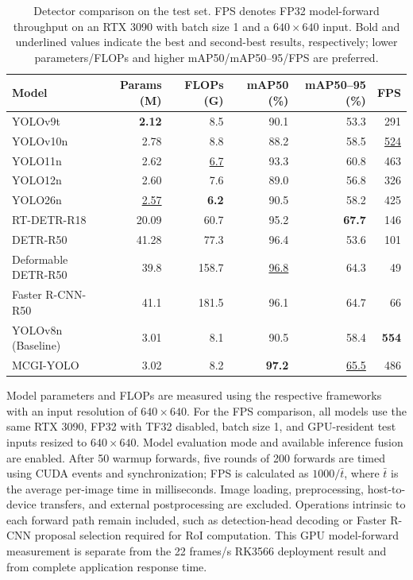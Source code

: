 \documentclass[journal]{IEEEtran}
\newcommand{\model}{MCGI-YOLO\xspace}
\begin{document}
\begin{table}[!t]
\caption{Detector comparison on the test set. FPS denotes FP32 model-forward throughput on an RTX 3090 with batch size 1 and a $640\times640$ input. Bold and underlined values indicate the best and second-best results, respectively; lower parameters/FLOPs and higher mAP50/mAP50--95/FPS are preferred.}
\label{tab:comparison}
\centering
\small
\setlength{\tabcolsep}{6pt}
\renewcommand{\arraystretch}{1.06}
\begin{tabular*}{\textwidth}{@{\extracolsep{\fill}}lrrrrr}
\toprule
Model & Params (M) & FLOPs (G) & mAP50 (\%) & mAP50--95 (\%) & FPS \\
\midrule
YOLOv9t & \textbf{2.12} & 8.5 & 90.1 & 53.3 & 291 \\
YOLOv10n & 2.78 & 8.8 & 88.2 & 58.5 & \underline{524} \\
YOLO11n & 2.62 & \underline{6.7} & 93.3 & 60.8 & 463 \\
YOLO12n & 2.60 & 7.6 & 89.0 & 56.8 & 326 \\
YOLO26n & \underline{2.57} & \textbf{6.2} & 90.5 & 58.2 & 425 \\
RT-DETR-R18 & 20.09 & 60.7 & 95.2 & \textbf{67.7} & 146 \\
DETR-R50 & 41.28 & 77.3 & 96.4 & 53.6 & 101 \\
Deformable DETR-R50 & 39.8 & 158.7 & \underline{96.8} & 64.3 & 49 \\
Faster R-CNN-R50 & 41.1 & 181.5 & 96.1 & 64.7 & 66 \\
YOLOv8n (Baseline) & 3.01 & 8.1 & 90.5 & 58.4 & \textbf{554} \\
\model & 3.02 & 8.2 & \textbf{97.2} & \underline{65.5} & 486 \\
\bottomrule
\end{tabular*}
\par\smallskip
\renewcommand{\arraystretch}{1.0}
\end{table}

Model parameters and FLOPs are measured using the respective frameworks with an input resolution of $640\times640$. For the FPS comparison, all models use the same RTX 3090, FP32 with TF32 disabled, batch size 1, and GPU-resident test inputs resized to $640\times640$. Model evaluation mode and available inference fusion are enabled. After 50 warmup forwards, five rounds of 200 forwards are timed using CUDA events and synchronization; FPS is calculated as $1000/\bar{t}$, where $\bar{t}$ is the average per-image time in milliseconds. Image loading, preprocessing, host-to-device transfers, and external postprocessing are excluded. Operations intrinsic to each forward path remain included, such as detection-head decoding or Faster R-CNN proposal selection required for RoI computation. This GPU model-forward measurement is separate from the 22 frames/s RK3566 deployment result and from complete application response time.
\end{document}
